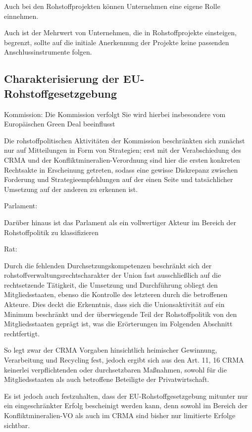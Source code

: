 \documentclass[12pt,a4paper,oneside]{book} %
\begin{document}
Auch bei den Rohstoffprojekten können Unternehmen eine eigene Rolle einnehmen.

Auch ist der Mehrwert von Unternehmen, die in Rohstoffprojekte einsteigen, begrenzt, sollte auf die initiale Anerkennung der Projekte keine passenden Anschlussinstrumente folgen.\autocite{KAS: Vom Dialog zur Lieferkette: S. 36}


\subsection{Charakterisierung der EU-Rohstoffgesetzgebung}

Kommission: Die Kommission verfolgt 
Sie wird hierbei insbesondere vom Europäischen Green Deal beeinflusst

Die rohstoffpolitischen Aktivitäten der Kommission beschränkten sich zunächst nur auf Mitteilungen in Form von Strategien; erst mit der Verabschiedung des CRMA und der Konfliktmineralien-Verordnung sind hier die ersten konkreten Rechtsakte in Erscheinung getreten, sodass eine gewisse Diskrepanz zwischen Forderung und Strategieempfehlungen auf der einen Seite und tatsächlicher Umsetzung auf der anderen zu erkennen ist.

Parlament: 

Darüber hinaus ist das Parlament als ein vollwertiger Akteur im Bereich der Rohstoffpolitik zu klassifizieren

Rat:



Durch die fehlenden Durchsetzungskompetenzen beschränkt sich der rohstoffverwaltungsrechtscharakter der Union fast ausschließlich auf die rechtsetzende Tätigkeit, die Umsetzung und Durchführung obliegt den Mitgliedsstaaten, ebenso die Kontrolle des letzteren durch die betroffenen Akteure. Dies deckt die Erkenntnis, dass sich die Unionsaktivität auf ein Minimum beschränkt und der überwiegende Teil der Rohstoffpolitik von den Mitgliedsstaaten geprägt ist, was die Erörterungen im Folgenden Abschnitt rechtfertigt.

So legt zwar der CRMA Vorgaben hinsichtlich heimischer Gewinnung, Verarbeitung und Recycling fest, jedoch ergibt sich aus den Art. 11, 16 CRMA keinerlei verpflichtenden oder durchsetzbaren Maßnahmen, sowohl für die Mitgliedsstaaten als auch betroffene Beteiligte der Privatwirtschaft.

Es ist jedoch auch festzuhalten, dass der EU-Rohstoffgesetzgebung mitunter nur ein eingeschränkter Erfolg bescheinigt werden kann, denn sowohl im Bereich der Konfliktmineralien-VO als auch im CRMA sind bisher nur limitierte Erfolge sichtbar.
\end{document}
